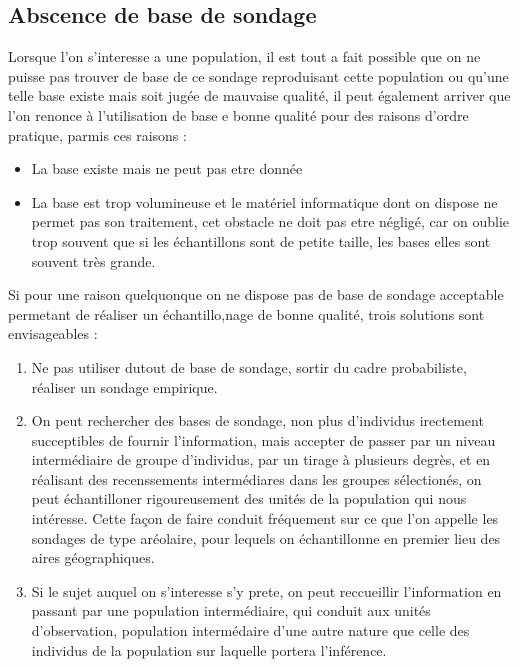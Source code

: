 \documentclass[a4paper]{article}
\begin{document}
\subsection{Abscence de base de sondage}
Lorsque l'on s'interesse a une population, il est tout a fait possible que on ne puisse pas trouver de base de ce sondage reproduisant cette
population ou qu'une telle base existe mais soit jugée de mauvaise qualité, il peut également arriver que l'on renonce à l'utilisation de base e bonne
qualité pour des raisons d'ordre pratique, parmis ces raisons : 
\begin{itemize}
    \item La base existe mais ne peut pas etre donnée 
    \item La base est trop volumineuse et le matériel informatique dont on dispose ne permet pas son traitement, cet obstacle ne doit pas etre négligé, 
        car on oublie trop souvent que si les échantillons sont de petite taille, les bases elles sont souvent très grande. 
\end{itemize}
Si pour une raison quelquonque on ne dispose pas de base de sondage acceptable permetant de réaliser un échantillo,nage de bonne qualité, trois
solutions sont envisageables :
\begin{enumerate}
    \item Ne pas utiliser dutout de base de sondage, sortir du cadre probabiliste, réaliser un sondage empirique.
    \item On peut rechercher des bases de sondage, non plus d'individus irectement succeptibles de fournir l'information, mais accepter de passer par
        un niveau intermédiaire de groupe d'individus, par un tirage à plusieurs degrès, et en réalisant des recenssements intermédiares dans les
        groupes sélectionés, on peut échantilloner rigoureusement des unités de la population qui nous intéresse. Cette façon de faire conduit
        fréquement sur ce que l'on appelle les sondages de type aréolaire, pour lequels on échantillonne en premier lieu des aires géographiques.
    \item Si le sujet auquel on s'interesse s'y prete, on peut reccueillir l'information en passant par une population intermédiaire, qui conduit aux
        unités d'observation, population intermédaire d'une autre nature que celle des individus de la population sur laquelle portera l'inférence.
\end{enumerate}
\end{document}
